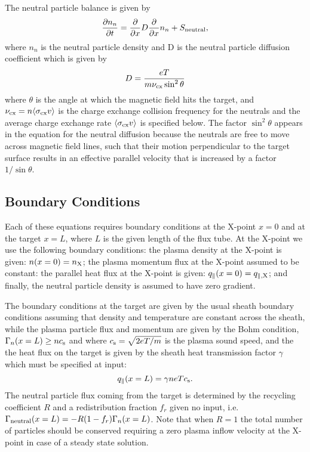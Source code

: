 \documentclass[amsmath,amssymb,a4]{revtex4-2}
\begin{document}
\noindent The neutral particle balance is given by
\begin{equation}\label{neutral_particle_balance}
    {\partial n_n \over \partial t} = {\partial \over \partial x} D {\partial \over \partial x} n_n + S_{\rm neutral},
\end{equation}
where $n_n$ is the neutral particle density and D is the neutral particle diffusion coefficient which is given by \cite{nakazawa2000}
\begin{equation}\label{neutral_diffusion_coefficient}
    D = { eT \over m \nu_{\rm cx} \sin^2\theta }
\end{equation}
where $\theta$ is the angle at which the magnetic field hits the target, and $\nu_{\rm cx} = n \langle\sigma_{\rm cx} v\rangle$ is the charge exchange collision frequency for the neutrals and the average charge exchange rate $\langle\sigma_{\rm cx} v\rangle$ is specified below. The factor $\sin^2\theta$ appears in the equation for the neutral diffusion because the neutrals are free to move across magnetic field lines, such that their motion perpendicular to the target surface results in an effective parallel velocity that is increased by a factor $1/\sin\theta$.


\subsection{Boundary Conditions}

Each of these equations requires boundary conditions at the X-point $x=0$ and at the target $x=L$, where $L$ is the given length of the flux tube. At the X-point we use the following boundary conditions:
the plasma density at the X-point is given: $n(x=0) = n_{\rm X}$; the plasma momentum flux at the X-point assumed to be constant: the parallel heat flux at the X-point is given:  $q_\parallel(x=0) = q_{\parallel,\rm X}$; and finally, the neutral particle density is assumed to have zero gradient.

The boundary conditions at the target are given by the usual sheath boundary conditions assuming that density and temperature are constant across the sheath, while the plasma particle flux and momentum are given by the Bohm condition, $\Gamma_n(x=L) \ge n c_{\rm s}$ and  where $c_{\rm s} = \sqrt{2eT/m}$ is the plasma sound speed, and the the heat flux on the target is given by the sheath heat transmission factor $\gamma$ which must be specified at input:
\begin{equation}\label{sheath_heat_transmission}
    q_\parallel(x=L) = \gamma n e T c_{\rm s}.
\end{equation}
The neutral particle flux coming from the target is determined by the recycling coefficient $R$ and a redistribution fraction $f_r$ given no input, i.e. $\Gamma_{\rm neutral}(x=L) = - R (1 - f_r) \Gamma_n(x=L)$. Note that when $R=1$ the total number of particles should be conserved requiring a zero plasma inflow velocity at the X-point in case of a steady state solution.
\end{document}
